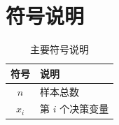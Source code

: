 \section{符号说明}
\begin{table}[H]
  \centering
  \caption{主要符号说明}
  \label{tab:symbols}
  \begin{tabularx}{\textwidth}{CL}
    \toprule
    符号 & 说明 \\
    \midrule
    $n$ & 样本总数 \\
    $x_i$ & 第 $i$ 个决策变量 \\
    \bottomrule
  \end{tabularx}
\end{table}
